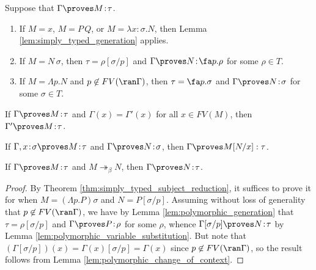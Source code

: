\documentclass[reqno]{amsart}
\begin{document}
    \begin{lemma}\label{lem:polymorphic_generation}
        Suppose that $\Gamma\proves M\!:\!\tau$.
        \begin{enumerate}
            \item If $M=x$, $M=P\,Q$, or $M=\lambda x\!:\!\sigma.N$, then Lemma \ref{lem:simply_typed_generation} applies.
            \item If $M=N\,\sigma$, then $\tau=\rho[\sigma/p]$ and $\Gamma\proves N\!:\!\fa p.\rho$ for some $\rho\in T$.
            \item If $M=\Lambda p.N$ and $p\not\in FV(\ran\Gamma)$, then $\tau=\fa p.\sigma$ and $\Gamma\proves N\!:\!\sigma$ for some $\sigma\in T$.
        \end{enumerate}
    \end{lemma}

    \begin{lemma}\label{lem:polymorphic_change_of_context}
        If $\Gamma\proves M\!:\!\tau$ and $\Gamma(x)=\Gamma'(x)$ for all $x\in FV(M)$, then $\Gamma'\proves M\!:\!\tau$.
    \end{lemma}

    \begin{lemma}\label{lem:polymorphic_substitution}
        If $\Gamma,x\!:\!\sigma\proves M\!:\!\tau$ and $\Gamma\proves N\!:\!\sigma$, then $\Gamma\proves M[N/x]:\tau$.
    \end{lemma}

    \begin{theorem}\label{thm:polymorphic_subject_reduction}
        If $\Gamma\proves M\!:\!\tau$ and $M\twoheadrightarrow_\beta N$, then $\Gamma\proves N\!:\!\tau$.
    \end{theorem}
    \begin{proof}
        By Theorem \ref{thm:simply_typed_subject_reduction}, it suffices to prove it for when $M=(\Lambda p.P)\sigma$ and $N=P[\sigma/p]$. Assuming without loss of generality that $p\not\in FV(\ran\Gamma)$, we have by Lemma \ref{lem:polymorphic_generation} that $\tau=\rho[\sigma/p]$ and $\Gamma\proves P\!:\!\rho$ for some $\rho$, whence $\Gamma[\sigma/p]\proves N\!:\!\tau$ by Lemma \ref{lem:polymorphic_variable_substitution}. But note that $(\Gamma[\sigma/p])(x)=\Gamma(x)[\sigma/p]=\Gamma(x)$ since $p\not\in FV(\ran\Gamma)$, so the result follows from Lemma \ref{lem:polymorphic_change_of_context}. 
    \end{proof}
\end{document}
